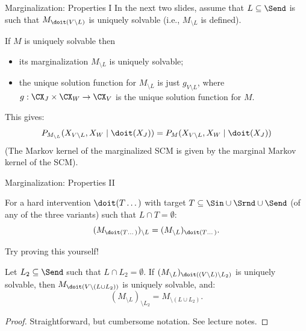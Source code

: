 \begin{frame}{Marginalization: Properties I}
In the next two slides, assume that
$L \subseteq \Send$ is such that $M_{\doit(V \setminus L)}$ is uniquely solvable
(i.e., $M_{\setminus L}$ is defined).
\begin{Lem}
  If $M$ is uniquely solvable then 
  \begin{itemize}
    \item its marginalization $M_{\setminus L}$ is uniquely solvable; 
    \item the unique solution function for $M_{\setminus L}$ is just $g_{V\setminus L}$, where 
  $g : \CX_J \times \CX_W \to \CX_V$ is the unique solution function for $M$.
  \end{itemize}
\end{Lem}

This gives:
$$P_{M_{\setminus L}}(X_{V\setminus L},X_W \mid \doit(X_J)) = P_{M}(X_{V\setminus L},X_W \mid \doit(X_J))$$
(The Markov kernel of the marginalized SCM is given by the marginal Markov kernel of the SCM).
\end{frame}
  
\begin{frame}{Marginalization: Properties II}
  \begin{Prp}
    For a hard intervention $\doit(T\dots)$ with target $T \subseteq \Sin \cup \Srnd \cup \Send$ (of any of the three variants) such that $L \cap T = \emptyset$:
    $$(M_{\doit(T\dots)})_{\setminus L} = (M_{\setminus L})_{\doit(T\dots)}.$$
\end{Prp}
Try proving this yourself!

\begin{Prp}
  Let $L_2 \subseteq \Send$ such that $L \cap L_2 = \emptyset$.
  If $(M_{\setminus L})_{\doit((V\setminus L)\setminus L_2)}$ is uniquely solvable, then $M_{\doit(V\setminus(L\cup L_2))}$ is uniquely solvable, and:
  $$(M_{\setminus L})_{\setminus L_2} = M_{\setminus (L\cup L_2)}.$$
\end{Prp}
\begin{proof}
  Straightforward, but cumbersome notation. See lecture notes.
\end{proof}
\end{frame}

